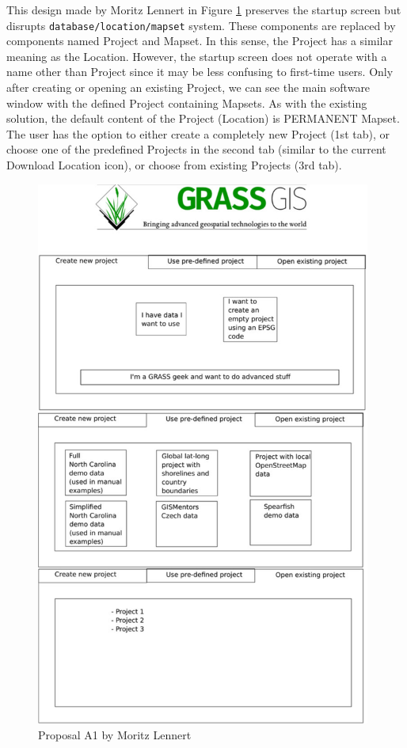 \documentclass[a4paper,10pt,twoside]{article}
\begin{document}
This design made by Moritz Lennert in Figure \ref{fig:proposalA1} preserves the startup screen but disrupts \texttt{database/location/mapset} system. These components are replaced by components named Project and Mapset. In this sense, the Project has a similar meaning as the Location. However, the startup screen does not operate with a name other than Project since it may be less confusing to first-time users. Only after creating or opening an existing Project, we can see the main software window with the defined Project containing Mapsets. As with the existing solution, the default content of the Project (Location) is PERMANENT Mapset. The user has the option to either create a completely new Project (1st tab), or choose one of the predefined Projects in the second tab (similar to the current Download Location icon), or choose from existing Projects (3rd tab).

\vspace{0.3cm}
\begin{figure}[hbt!] 
\begin{center}
\includegraphics[width=11cm]{../pictures/proposalA1.png} 
\caption[Proposal A1 by Moritz Lennert]{Proposal A1 by Moritz Lennert}
\label{fig:proposalA1}
\end{center}
\end{figure}
\end{document}
